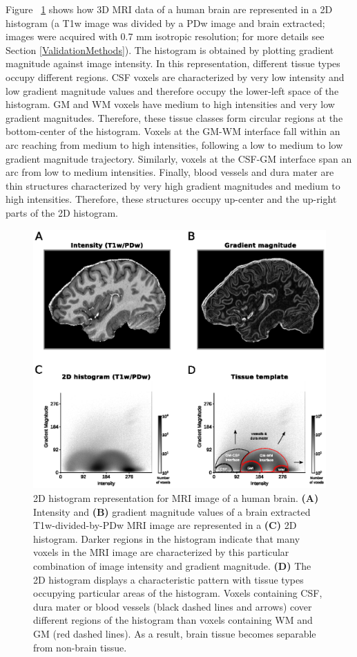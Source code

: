 Figure ~\ref{Fig1} shows how 3D MRI data of a human brain are represented in a 2D histogram (a T1w image was divided by a PDw image \parencite{Moortele2009} and brain extracted; images were acquired with 0.7 mm isotropic resolution; for more details see Section \ref{ValidationMethods}). The histogram is obtained by plotting gradient magnitude against image intensity. In this representation, different tissue types occupy different regions. CSF voxels are characterized by very low intensity and low gradient magnitude values and therefore occupy the lower-left space of the histogram. GM and WM voxels have medium to high intensities and very low gradient magnitudes. Therefore, these tissue classes form circular regions at the bottom-center of the histogram. Voxels at the GM-WM interface fall within an arc reaching from medium to high intensities, following a low to medium to low gradient magnitude trajectory. Similarly, voxels at the CSF-GM interface span an arc from low to medium intensities. Finally, blood vessels and dura mater are thin structures characterized by very high gradient magnitudes and medium to high intensities. Therefore, these structures occupy up-center and the up-right parts of the 2D histogram.

\begin{figure}[htb!]
\centering
\includegraphics[width=\textwidth]{figures/chapter_02/figure_1.eps}
\caption{2D histogram representation for MRI image of a human brain.
\textbf{(A)} Intensity and \textbf{(B)} gradient magnitude values of a brain extracted T1w-divided-by-PDw MRI image are represented in a \textbf{(C)} 2D histogram. Darker regions in the histogram indicate that many voxels in the MRI image are characterized by this particular combination of image intensity and gradient magnitude. \textbf{(D)} The 2D histogram displays a characteristic pattern with tissue types occupying particular areas of the histogram. Voxels containing CSF, dura mater or blood vessels (black dashed lines and arrows) cover different regions of the histogram than voxels containing WM and GM (red dashed lines). As a result, brain tissue becomes separable from non-brain tissue.}
\label{Fig1}
\end{figure}

